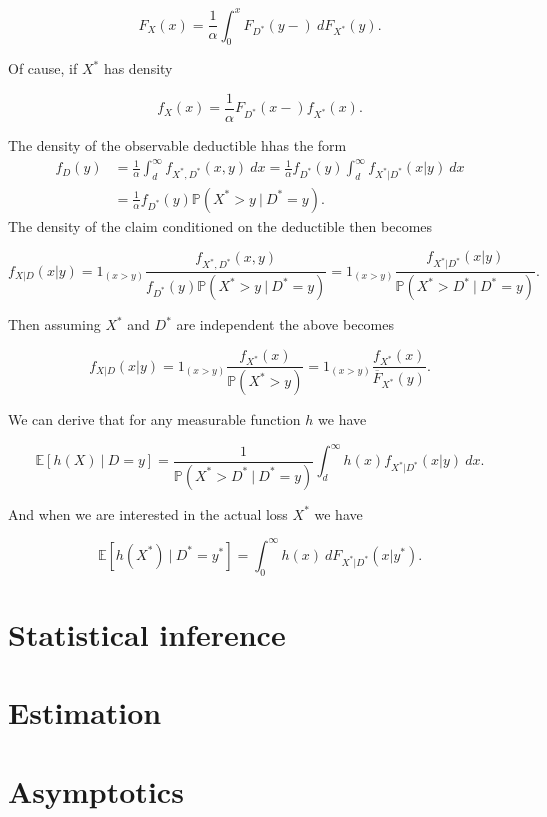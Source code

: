 \documentclass[a4paper,10pt,openany]{book}
\begin{document}
\[
F_X(x)=\frac{1}{\alpha}\int_0^xF_{D^*}(y-)\ dF_{X^*}(y).
\]

Of cause, if \(X^*\) has density

\[
f_X(x)=\frac{1}{\alpha}F_{D^*}(x-)f_{X^*}(x).
\]

The density of the observable deductible hhas the form
\begin{align*}
f_D(y)&=\frac{1}{\alpha}\int_d^\infty f_{X^*,D^*}(x,y)\ dx=\frac{1}{\alpha} f_{D^*}(y)\int_d^\infty f_{X^*\vert D^*}(x\vert y)\ dx\\
&=\frac{1}{\alpha} f_{D^*}(y)\mathbb P(X^*> y\ \vert\ D^* = y).
\end{align*}
The density of the claim conditioned on the deductible then becomes

\[
f_{X\vert D}(x\vert y)=1_{(x> y)}\frac{f_{X^*,D^*}(x,y)}{f_{D^*}(y)\mathbb P(X^*> y\ \vert\ D^*=y)}=1_{(x> y)}\frac{f_{X^*\vert D^*}(x\vert y)}{\mathbb P(X^*> D^*\ \vert\ D^*=y)}.
\]

Then assuming \(X^*\) and \(D^*\) are independent the above becomes

\[
f_{X\vert D}(x\vert y)=1_{(x> y)}\frac{f_{X^*}(x)}{\mathbb P(X^*> y)}=1_{(x> y)}\frac{f_{X^*}(x)}{\overline F_{X^*}(y)}.
\]

We can derive that for any measurable function \(h\) we have

\[
\mathbb E[h(X)\ \vert\ D=y]=\frac{1}{\mathbb P(X^*> D^*\ \vert\ D^* =y)}\int_d^\infty h(x) f_{X^*\vert D^*}(x\vert y)\ dx.
\]

And when we are interested in the actual loss \(X^*\) we have

\[
\mathbb E[h(X^*)\ \vert\ D^*=y^*]=\int_0^\infty h(x)\ dF_{X^*\vert D^*}(x\vert y^*).
\]

\hypertarget{statistical-inference}{%
\section{Statistical inference}\label{statistical-inference}}

\hypertarget{estimation}{%
\section{Estimation}\label{estimation}}

\hypertarget{asymptotics}{%
\section{Asymptotics}\label{asymptotics}}
\end{document}
